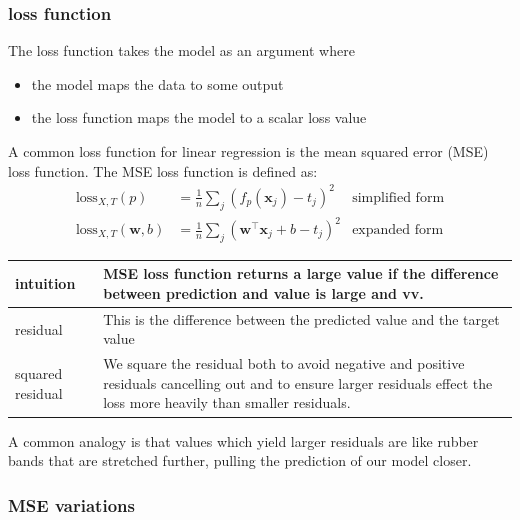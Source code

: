 \documentclass[12pt]{article}
\theoremstyle{definition}
\begin{document}
\subsubsection*{loss function}

The loss function takes the model as an argument where
\begin{itemize}[leftmargin=*, noitemsep]
    \item the model maps the data to some output
    \item the loss function maps the model to a scalar loss value
\end{itemize}

A common loss function for linear regression is the mean squared error (MSE) loss function. The MSE loss function is defined as:
\begin{align*}
    \text{loss}_{X, T}(p) & = \frac{1}{n}\sum_{j}{(f_p(\mathbf{x}_j) - t_j)}^2 & \text{simplified form} \\
    \text{loss}_{X, T}(\mathbf{w}, b) & = \frac{1}{n}\sum_{j}{(\mathbf{w}^\intercal \mathbf{x}_j + b - t_j)}^2 & \text{expanded form}
\end{align*}

\begin{center}
    \begin{tabular}{|M{3cm}|M{0.80\textwidth}|}
        \hline
        intuition & MSE loss function returns a large value if the difference between prediction and value is large and vv. \\
        \hline
        residual & This is the difference between the predicted value and the target value \\
        \hline
        squared residual & We square the residual both to avoid negative and positive residuals cancelling out and to ensure larger residuals effect the loss more heavily than smaller residuals. \\
        \hline
    \end{tabular}
\end{center}

A common analogy is that values which yield larger residuals are like rubber bands that are stretched further, pulling the prediction of our model closer.\\

\subsubsection*{MSE variations}
\end{document}
